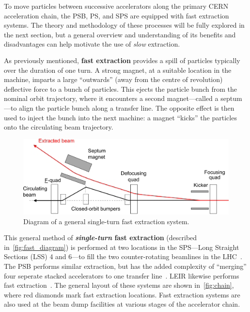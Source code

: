 \documentclass[11pt]{report}
\begin{document}
To move particles between successive accelerators along the primary CERN acceleration chain, the PSB, PS, and SPS are equipped with fast extraction systems. The theory and methodology of these processes will be fully explored in the next section, but a general overview and understanding of its benefits and disadvantages can help motivate the use of \textit{slow} extraction. 

As previously mentioned, \textbf{fast extraction} provides a spill of particles typically over the duration of one turn. A strong magnet, at a suitable location in the machine, imparts a large ``outwards'' (away from the centre of revolution) deflective force to a bunch of particles. This ejects the particle bunch from the nominal orbit trajectory, where it encounters a second magnet---called a septum---to align the particle bunch along a transfer line. The opposite effect is then used to inject the bunch into the next machine: a magnet ``kicks'' the particles onto the circulating beam trajectory.

\begin{figure}[h]
  \centering
  \includegraphics[width=\linewidth]{fast.png}
  \caption{Diagram of a general single-turn fast extraction system.~\cite{Fraser:CAS}}
  \label{fig:fast_diagram}
\end{figure}

This general method of \textbf{\textit{single-turn} fast extraction} (described in~\autoref{fig:fast_diagram}) is performed at two locations in the SPS---Long Straight Sections (LSS) 4 and 6---to fill the two counter-rotating beamlines in the LHC~\cite{Fraser:CAS}. The PSB performs similar extraction, but has the added complexity of ``merging'' four seperate stacked accelerators to one transfer line~\cite{Metzmacher:2061508}. LEIR likewise performs fast extraction~\cite{Ghithan:2017wpd}. The general layout of these systems are shown in~\ref{fig:chain}, where red diamonds mark fast extraction locations. Fast extraction systems are also used at the beam dump facilities at various stages of the accelerator chain.
\end{document}
